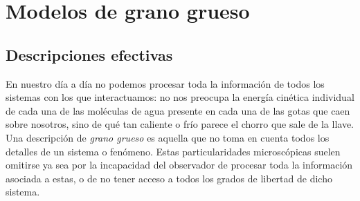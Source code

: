 \section{Modelos de grano grueso}\label{sec:Ch1CG}

\subsection{Descripciones efectivas}




En nuestro día a día no podemos procesar toda la información de todos los sistemas con los que interactuamos: no nos preocupa la energía cinética individual de cada una de las moléculas de agua presente en cada una de las gotas que caen sobre nosotros, sino de qué tan caliente o frío parece el chorro que sale de la llave. Una descripción de \textit{grano grueso} es aquella que no toma en cuenta todos los detalles de un sistema o fenómeno. Estas particularidades microscópicas suelen omitirse ya sea por la incapacidad del observador de procesar toda la información asociada a estas, o de no tener acceso a todos los grados de libertad de dicho sistema.

